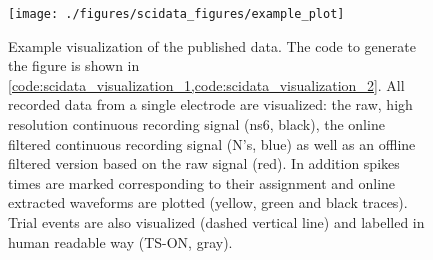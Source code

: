 \begin{figure}[htb]
 \texttt{[image: ./figures/scidata\_figures/example\_plot]}
 \caption[Example visualization of the published data]{Example visualization of the published data. The code to generate the figure is shown in \cref{code:scidata_visualization_1,code:scidata_visualization_2}. All recorded data from a single electrode are visualized: the raw, high resolution continuous recording signal (ns6, black), the online filtered continuous recording signal (N's, blue) as well as an offline filtered version based on the raw signal (red). In addition spikes times are marked corresponding to their  assignment and online extracted waveforms are plotted (yellow, green and black traces). Trial events are also visualized (dashed vertical line) and labelled in human readable way (TS-ON, gray).}
 \label{fig:scidata_visualization}
\end{figure}

